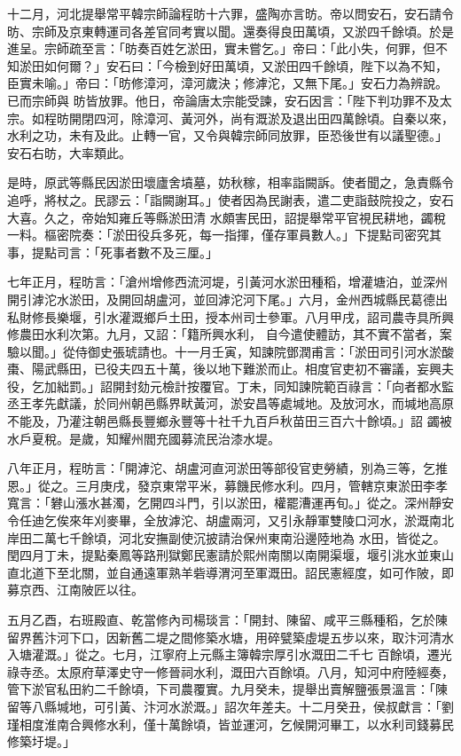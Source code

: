 \begin{pinyinscope}
 十二月，河北提舉常平韓宗師論程昉十六罪，盛陶亦言昉。帝以問安石，安石請令昉、宗師及京東轉運司各差官同考實以聞。還奏得良田萬頃，又淤四千餘頃。於是進呈。宗師疏至言：「昉奏百姓乞淤田，實未嘗乞。」帝曰：「此小失，何罪，但不知淤田如何爾？」安石曰：「今檢到好田萬頃，又淤田四千餘頃，陛下以為不知，臣實未喻。」帝曰：「昉修漳河，漳河歲決；修滹沱，又無下尾。」安石力為辨說。已而宗師與
 昉皆放罪。他日，帝論唐太宗能受諫，安石因言：「陛下判功罪不及太宗。如程昉開閉四河，除漳河、黃河外，尚有溉淤及退出田四萬餘頃。自秦以來，水利之功，未有及此。止轉一官，又令與韓宗師同放罪，臣恐後世有以議聖德。」安石右昉，大率類此。



 是時，原武等縣民因淤田壞廬舍墳墓，妨秋稼，相率詣闕訴。使者聞之，急責縣令追呼，將杖之。民謬云：「詣闕謝耳。」使者因為民謝表，遣二吏詣鼓院投之，安石大喜。久之，帝始知雍丘等縣淤田清
 水頗害民田，詔提舉常平官視民耕地，蠲稅一料。樞密院奏：「淤田役兵多死，每一指揮，僅存軍員數人。」下提點司密究其事，提點司言：「死事者數不及三厘。」



 七年正月，程昉言：「滄州增修西流河堤，引黃河水淤田種稻，增灌塘泊，並深州開引滹沱水淤田，及開回胡盧河，並回滹沱河下尾。」六月，金州西城縣民葛德出私財修長樂堰，引水灌溉鄉戶土田，授本州司士參軍。八月甲戌，詔司農寺具所興修農田水利次第。九月，又詔：「籍所興水利，
 自今遣使體訪，其不實不當者，案驗以聞。」從侍御史張琥請也。十一月壬寅，知諫院鄧潤甫言：「淤田司引河水淤酸棗、陽武縣田，已役夫四五十萬，後以地下難淤而止。相度官吏初不審議，妄興夫役，乞加絀罰。」詔開封劾元檢計按覆官。丁未，同知諫院範百祿言：「向者都水監丞王孝先獻議，於同州朝邑縣界畎黃河，淤安昌等處堿地。及放河水，而堿地高原不能及，乃灌注朝邑縣長豐鄉永豐等十社千九百戶秋苗田三百六十餘頃。」詔
 蠲被水戶夏稅。是歲，知耀州閻充國募流民治漆水堤。



 八年正月，程昉言：「開滹沱、胡盧河直河淤田等部役官吏勞績，別為三等，乞推恩。」從之。三月庚戌，發京東常平米，募饑民修水利。四月，管轄京東淤田李孝寬言：「礬山漲水甚濁，乞開四斗門，引以淤田，權罷漕運再旬。」從之。深州靜安令任迪乞俟來年刈麥畢，全放滹沱、胡盧兩河，又引永靜軍雙陵口河水，淤溉南北岸田二萬七千餘頃，河北安撫副使沉披請治保州東南沿邊陸地為
 水田，皆從之。閏四月丁未，提點秦鳳等路刑獄鄭民憲請於熙州南關以南開渠堰，堰引洮水並東山直北道下至北關，並自通遠軍熟羊砦導渭河至軍溉田。詔民憲經度，如可作陂，即募京西、江南陂匠以往。



 五月乙酉，右班殿直、乾當修內司楊琰言：「開封、陳留、咸平三縣種稻，乞於陳留界舊汴河下口，因新舊二堤之間修築水塘，用碎甓築虛堤五步以來，取汴河清水入塘灌溉。」從之。七月，江寧府上元縣主簿韓宗厚引水溉田二千七
 百餘頃，遷光祿寺丞。太原府草澤史守一修晉祠水利，溉田六百餘頃。八月，知河中府陸經奏，管下淤官私田約二千餘頃，下司農覆實。九月癸未，提舉出賣解鹽張景溫言：「陳留等八縣堿地，可引黃、汴河水淤溉。」詔次年差夫。十二月癸丑，侯叔獻言：「劉瑾相度淮南合興修水利，僅十萬餘頃，皆並運河，乞候開河畢工，以水利司錢募民修築圩堤。」




\end{pinyinscope}
